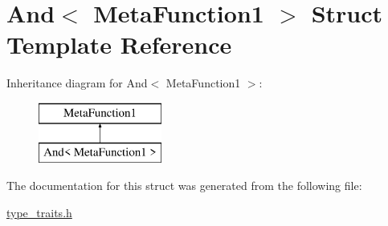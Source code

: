 \hypertarget{struct_and_3_01_meta_function1_01_4}{}\section{And$<$ Meta\+Function1 $>$ Struct Template Reference}
\label{struct_and_3_01_meta_function1_01_4}
Inheritance diagram for And$<$ Meta\+Function1 $>$\+:\begin{figure}[H]
\begin{center}
\leavevmode
\includegraphics[height=2.000000cm]{struct_and_3_01_meta_function1_01_4}
\end{center}
\end{figure}


The documentation for this struct was generated from the following file\+:\begin{DoxyCompactItemize}
\item 
\hyperlink{type__traits_8h}{type\+\_\+traits.\+h}\end{DoxyCompactItemize}
